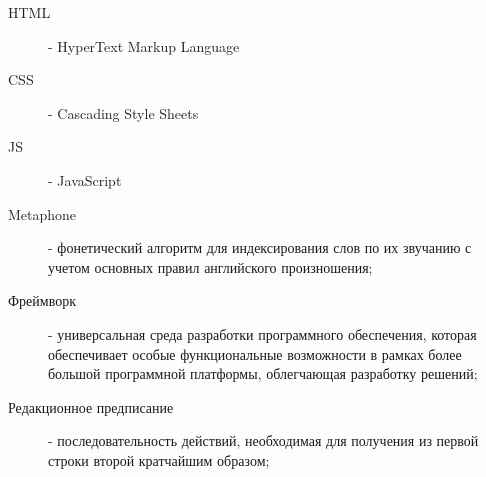 \abbreviations
\begin{description}
    \item[HTML] - HyperText Markup Language
    \item[CSS] - Cascading Style Sheets
    \item[JS] - JavaScript
\end{description}
\begin{description}
	\item[Metaphone] - фонетический алгоритм для индексирования слов по их звучанию с учетом основных правил английского произношения;
	\item[Фреймворк] - универсальная среда разработки программного обеспечения, которая обеспечивает особые функциональные возможности в рамках более большой программной платформы, облегчающая разработку решений;
	\item[Редакционное предписание] - последовательность действий, необходимая для получения из первой строки второй кратчайшим образом;
\end{description}